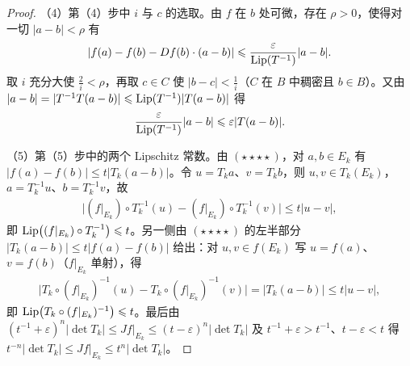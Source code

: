 \documentclass[../../main.tex]{subfiles}%
\begin{document}
\begin{proof}
（4）第（4）步中 $i$ 与 $c$ 的选取。由 $f$ 在 $b$ 处可微，存在 $\rho>0$，使得对一切 $\lvert a-b\rvert<\rho$ 有
\begin{align*}
\lvert f(a)-f(b)-Df(b)\cdot(a-b)\rvert\leqslant\frac{\varepsilon}{\operatorname{Lip}(T^{-1})}\lvert a-b\rvert .
\end{align*}
取 $i$ 充分大使 $\frac2i<\rho$，再取 $c\in C$ 使 $\lvert b-c\rvert<\frac1i$（$C$ 在 $B$ 中稠密且 $b\in B$）。又由 $\lvert a-b\rvert=\lvert T^{-1}T(a-b)\rvert\leqslant\operatorname{Lip}(T^{-1})\lvert T(a-b)\rvert$ 得
\begin{align*}
\frac{\varepsilon}{\operatorname{Lip}(T^{-1})}\lvert a-b\rvert\leqslant\varepsilon\lvert T(a-b)\rvert .
\end{align*}

（5）第（5）步中的两个 Lipschitz 常数。由 $(\star\star\star\star)$，对 $a,b\in E_k$ 有 $\lvert f(a)-f(b)\rvert\leqslant t\lvert T_k(a-b)\rvert$。令 $u=T_ka$、$v=T_kb$，则 $u,v\in T_k(E_k)$，$a=T_k^{-1}u$、$b=T_k^{-1}v$，故
\begin{align*}
\bigl\lvert(f|_{E_k})\circ T_k^{-1}(u)-(f|_{E_k})\circ T_k^{-1}(v)\bigr\rvert\leqslant t\lvert u-v\rvert ,
\end{align*}
即 $\operatorname{Lip}\bigl((f|_{E_k})\circ T_k^{-1}\bigr)\leqslant t$。另一侧由 $(\star\star\star\star)$ 的左半部分 $\lvert T_k(a-b)\rvert\leqslant t\lvert f(a)-f(b)\rvert$ 给出：对 $u,v\in f(E_k)$ 写 $u=f(a)$、$v=f(b)$（$f|_{E_k}$ 单射），得
\begin{align*}
\bigl\lvert T_k\circ(f|_{E_k})^{-1}(u)-T_k\circ(f|_{E_k})^{-1}(v)\bigr\rvert=\lvert T_k(a-b)\rvert\leqslant t\lvert u-v\rvert ,
\end{align*}
即 $\operatorname{Lip}\bigl(T_k\circ(f|_{E_k})^{-1}\bigr)\leqslant t$。最后由 $(t^{-1}+\varepsilon)^n\lvert\det T_k\rvert\leqslant Jf|_{E_k}\leqslant(t-\varepsilon)^n\lvert\det T_k\rvert$ 及 $t^{-1}+\varepsilon>t^{-1}$、$t-\varepsilon<t$ 得 $t^{-n}\lvert\det T_k\rvert\leqslant Jf|_{E_k}\leqslant t^n\lvert\det T_k\rvert$。
\end{proof}
\end{document}
